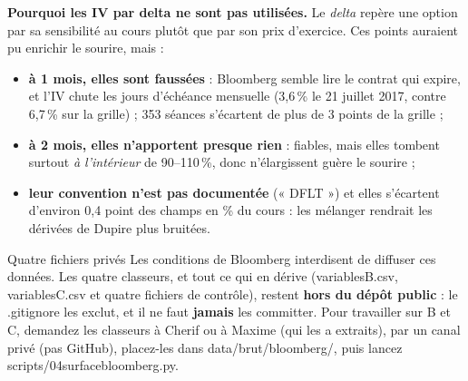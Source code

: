 \documentclass[10pt,a4paper]{article}
\newcommand{\coupure}{\textunderscore\allowbreak}
\newcommand{\fic}[1]{{\small\ttfamily\let\_\coupure #1}}
\begin{document}
\textbf{Pourquoi les IV par delta ne sont pas utilisées.} Le \emph{delta} repère une option par sa sensibilité au cours plutôt que par son prix d'exercice. Ces points auraient pu enrichir le sourire, mais :
\begin{itemize}[nosep,leftmargin=*]
  \item \textbf{à 1 mois, elles sont faussées} : Bloomberg semble lire le contrat qui expire, et l'IV chute les jours d'échéance mensuelle (3,6\,\% le 21 juillet 2017, contre 6,7\,\% sur la grille) ; 353 séances s'écartent de plus de 3 points de la grille ;
  \item \textbf{à 2 mois, elles n'apportent presque rien} : fiables, mais elles tombent surtout \emph{à l'intérieur} de 90–110\,\%, donc n'élargissent guère le sourire ;
  \item \textbf{leur convention n'est pas documentée} (« DFLT ») et elles s'écartent d'environ 0,4 point des champs en \% du cours : les mélanger rendrait les dérivées de Dupire plus bruitées.
\end{itemize}

\begin{attention}{Quatre fichiers privés}
Les conditions de Bloomberg interdisent de diffuser ces données. Les quatre classeurs, et tout ce qui en dérive (\fic{variables\_B.csv}, \fic{variables\_C.csv} et quatre fichiers de contrôle), restent \textbf{hors du dépôt public} : le \fic{.gitignore} les exclut, et il ne faut \textbf{jamais} les committer. Pour travailler sur B et C, demandez les classeurs à Cherif ou à Maxime (qui les a extraits), par un canal privé (pas GitHub), placez-les dans \fic{data/brut/bloomberg/}, puis lancez \fic{scripts/04\_surface\_bloomberg.py}.
\end{attention}
\end{document}
